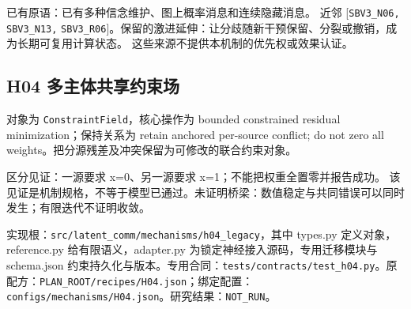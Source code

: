 \documentclass[
  10pt,
]{article}
\begin{document}
已有原语：已有多种信念维护、图上概率消息和连续隐藏消息。 近邻
{[}\nolinkurl{SBV3_N06,} \nolinkurl{SBV3_N13,}
\nolinkurl{SBV3_R06}{]}。保留的激进延伸：让分歧随新干预保留、分裂或撤销，成为长期可复用计算状态。
这些来源不提供本机制的优先权或效果认证。

\subsection{H04
多主体共享约束场}\label{h04-ux591aux4e3bux4f53ux5171ux4eabux7ea6ux675fux573a}

对象为 \nolinkurl{ConstraintField}，核心操作为 bounded constrained
residual minimization；保持关系为 retain anchored per-source conflict;
do not zero all weights。把分源残差及冲突保留为可修改的联合约束对象。

区分见证：一源要求 x=0、另一源要求 x=1；不能把权重全置零并报告成功。
该见证是机制规格，不等于模型已通过。未证明桥梁：数值稳定与共同错误可以同时发生；有限迭代不证明收敛。

实现根：{\small\nolinkurl{src/latent_comm/mechanisms/h04_legacy}}，其中
types.py 定义对象，reference.py 给有限语义，adapter.py
为锁定神经接入源码，专用迁移模块与 schema.json
约束持久化与版本。专用合同：{\small\nolinkurl{tests/contracts/test_h04.py}}。原配方：{\small\nolinkurl{PLAN_ROOT/recipes/H04.json}}；绑定配置：{\small\nolinkurl{configs/mechanisms/H04.json}}。研究结果：\nolinkurl{NOT_RUN}。
\end{document}

